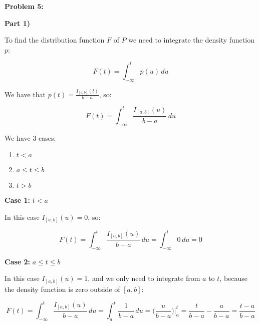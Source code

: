 \textbf{Problem 5:}

\singlespacing

\textbf{Part 1)}

\singlespacing

To find the distribution function $F$ of $P$ we need to integrate the density function $p$:

\singlespacing

\begin{equation}
    F(t) = \int_{-\infty}^{t} p(u) \, du
\end{equation}

\singlespacing

We have that $p(t) = \frac{I_{[a,b]}(t)}{b-a}$, so:

\singlespacing

\begin{equation}
    F(t) = \int_{-\infty}^{t} \frac{I_{[a,b]}(u)}{b-a} \, du
\end{equation}

\singlespacing

We have 3 cases:

\singlespacing

\begin{enumerate}
    \item $t < a$
    \item $a \leq t \leq b$
    \item $t > b$
\end{enumerate}

\singlespacing

\textbf{Case 1:} $t < a$

\singlespacing

In this case $I_{[a,b]}(u) = 0$, so:

\singlespacing

\begin{equation}
    F(t) = \int_{-\infty}^{t} \frac{I_{[a,b]}(u)}{b-a} \, du = \int_{-\infty}^{t} 0 \, du = 0
\end{equation}

\singlespacing

\textbf{Case 2:} $a \leq t \leq b$

\singlespacing

In this case $I_{[a,b]}(u) = 1$, and we only need to integrate from $a$ to $t$,
because the density function is zero outside of $[a, b]$:

\singlespacing

\begin{equation}
    F(t) = \int_{-\infty}^{t} \frac{I_{[a,b]}(u)}{b-a} \, du = \int_{a}^{t} \frac{1}{b-a} \, du = \Big(\frac{u}{b-a} \Big)\Big|_{a}^{t} = \frac{t}{b-a} - \frac{a}{b-a} = \frac{t - a}{b-a}
\end{equation}

